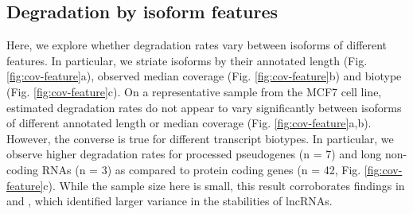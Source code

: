 \subsection{Degradation by isoform features}

Here, we explore whether degradation rates vary between isoforms of different features. In particular, we striate isoforms by their annotated length (Fig. \ref{fig:cov-feature}a), observed median coverage (Fig. \ref{fig:cov-feature}b) and biotype (Fig. \ref{fig:cov-feature}c). On a representative sample from the MCF7 cell line, estimated degradation rates do not appear to vary significantly between isoforms of different annotated length or median coverage (Fig. \ref{fig:cov-feature}a,b). However, the converse is true for different transcript biotypes. In particular, we observe higher degradation rates for processed pseudogenes (n = 7) and long non-coding RNAs (n = 3) as compared to protein coding genes (n = 42, Fig. \ref{fig:cov-feature}c). While the sample size here is small, this result corroborates findings in \cite{Clark2012} and \cite{Kaiwan2021}, which identified larger variance in the stabilities of lncRNAs.   

